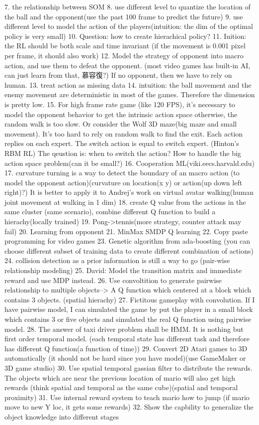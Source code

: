 7. the relationship between SOM
8. use different level to quantize the location of the ball and the opponent(use the past 100 frame to predict the future)
9. use different level to model the action of the players(intuition: the dim of the optimal policy is very small)
10. Question: how to create hierachical policy?
11. Iuition: the RL should be both scale and time invariant (if the movement is 0.001 pixel per frame, it should also work)
12. Model the strategy of opponent into macro action, and use them to defeat the opponent. (most video games has built-in AI, can just learn from that, 慕容復?)
If no opponent, then we have to rely on human.
13. treat action as missing data
14. intuition: the ball movement and the enemy movement are deterministic in most of the games. Therefore the dimension is pretty low.
15. For high frame rate game (like 120 FPS), it's necessary to model the opponent behavior to get the intrinsic action space
otherwise, the random walk is too slow. Or consider the Wolf 3D maze(big maze and small movement). It's too hard to rely on random walk to find the exit.
Each action replies on each expert. The switch action is equal to switch expert. (Hinton's RBM RL)
The qeustion is: when to switch the action? How to handle the big action space problem(can it be small?)
16. Cooperation ML(viki.eecs.harvald.edu)
17. curvature turning is a way to detect the boundary of an macro action (to model the opponent action)(curvature on location(x y) or action(up down left right)?)
It is better to apply it to Andrej's work on virtual avatar walking(human joint movement at walking in 1 dim)
18. create Q value from the actions in the same cluster (same scenario), combine different Q function to build a hierachy(locally trained)
19. Pong->tennis(more strategy, counter attack may fail)
20. Learning from opponent
21. MinMax SMDP Q learning
22. Copy paste programming for video games
23. Genetic algorithm from ada-boosting (you can choose different subset of training data to create different combination 
of actions)
24. collision detection as a prior information is still a way to go (pair-wise relationship modeling)
25. David: Model the transition matrix and immediate reward and use MDP instead.
26. Use convoltition to generate pairwise relationship to multiple objects--> A Q function which centered at a block which contains 
3 objects. (spatial hierachy)
27. Fictitous gameplay with convolution. If I have pairwise model, I can simulated the game by put the player in a 
small block which contains 3 or five objects and simulated the real Q function using pairwise model.
28. The answer of taxi driver problem shall be HMM. It is nothing but first order temporal model. (each temporal
state has different task and therefore has different Q function(a function of time))
29. Convert 2D Atari games to 3D automatically (it should not be hard since you have model)(use GameMaker or 3D game studio)
30. Use spatial temporal gassian filter to distribute the rewards. The objects which are near the previous location of mario
will also get high rewards (think spatial and temporal as the same cube)(spatial and temporal proximity)
31. Use internal reward system to teach mario how to jump (if mario move to new Y loc, it gets some rewards)
32. Show the capbility to generalize the object knowledge into different stages
